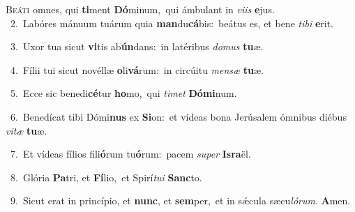 \lettrine{\initial\textcolor{\initialcolor}{B}}{eáti} omnes, qui \textbf{ti}\-ment \textbf{Dó}\-minum,~\star qui ámbulant in \textit{vi}\-\textit{is} \textbf{e}\-jus.\\
{\numbfont\textcolor{\numbcolor}{~2.}}~Labóres mánuum tuárum quia \textbf{man}\-du\-\textbf{cá}\-bis:~\star beátus es, et bene \textit{ti}\-\textit{bi} \textbf{e}\-rit.\par
{\numbfont\textcolor{\numbcolor}{~3.}}~Uxor tua sicut \textbf{vi}\-tis ab\-\textbf{ún}\-dans:~\star in latéribus \textit{do}\-\textit{mus} \textbf{tu}\-æ.\par
{\numbfont\textcolor{\numbcolor}{~4.}}~Fílii tui sicut novéllæ \textbf{o}\-li\-\textbf{vá}\-rum:~\star in circúitu \textit{men}\-\textit{sæ} \textbf{tu}\-æ.\par
{\numbfont\textcolor{\numbcolor}{~5.}}~Ecce sic benedi\-\textbf{cé}\-tur \textbf{ho}\-mo,~\star qui \textit{ti}\-\textit{met} \textbf{Dó}\-\textbf{mi}num.\par
{\numbfont\textcolor{\numbcolor}{~6.}}~Benedícat tibi Dómi\textbf{nus} ex \textbf{Si}\-on:~\star et vídeas bona Jerúsalem ómnibus diébus \textit{vi}\-\textit{tæ} \textbf{tu}\-æ.\par
{\numbfont\textcolor{\numbcolor}{~7.}}~Et vídeas fílios fili\-\textbf{ó}\-rum tu\-\textbf{ó}\-rum:~\star pacem \textit{su}\-\textit{per} \textbf{Is}\-\textbf{ra}ël.\par
{\numbfont\textcolor{\numbcolor}{~8.}}~Glória \textbf{Pa}\-tri, et \textbf{Fí}\-lio,~\star et Spirí\-\textit{tu}\-\textit{i} \textbf{Sanc}\-to.\par
{\numbfont\textcolor{\numbcolor}{~9.}}~Sicut erat in princípio, et \textbf{nunc}\-, et \textbf{sem}\-per,~\star et in sǽcula sæcu\-\textit{ló}\-\textit{rum}. \textbf{A}\-men.\par
